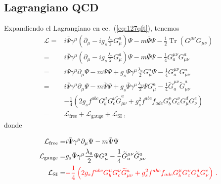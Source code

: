 \subsection{Lagrangiano QCD}

\begin{frame}
Expandiendo el Lagrangiano en ec.~(\ref{eq:127qft}), tenemos
\begin{align}
  \mathcal{L}=&i\bar{\Psi}\gamma^\mu\left(\partial_\mu-i g_s\frac{\lambda_a}{2}G_\mu^a\right)\Psi
  -m\bar{\Psi}\Psi- \frac{1}{2}\operatorname{Tr}\left(G^{\mu\nu} G_{\mu\nu}\right)\nonumber\\
  =&i\bar{\Psi}\gamma^\mu\left(\partial_\mu-i g_s\frac{\lambda_a}{2}G_\mu^a\right)\Psi
  -m\bar{\Psi}\Psi- \frac{1}{4}G^{\mu\nu}_a G_{\mu\nu}^a\nonumber\\
=&i\bar{\Psi}\gamma^\mu\partial_\mu\Psi-m\bar{\Psi}\Psi+g_s\bar{\Psi}\gamma^\mu\frac{\lambda_a}{2}G_\mu^a\Psi
  - \frac{1}{4}G^{\mu\nu}_a G_{\mu\nu}^a\nonumber\\
=&i\bar{\Psi}\gamma^\mu\partial_\mu\Psi-m\bar{\Psi}\Psi+g_s\bar{\Psi}\gamma^\mu\frac{\lambda_a}{2}\Psi G_\mu^a
  - \frac{1}{4}\widetilde{G}^{\mu\nu}_a \widetilde{G}_{\mu\nu}^a\nonumber\\
  &- \frac{1}{4}\left(%
    2g_sf^{a b c}G_b^\mu G_c^\nu\widetilde{G}_{\mu\nu}^a
    +g_s^2f^{a b c}f_{a d e}G_b^\mu G_c^\nu G^d_\mu G^e_\nu\right)\nonumber\\
=&\mathcal{L}_{\text{free}}+\mathcal{L}_{\text{gauge}}+\mathcal{L}_{\text{SI}}\,,
\end{align}
donde

\begin{align}
\label{eq:qcdgauge}
\mathcal{L}_{\text{free}}=&i\bar{\Psi}\gamma^\mu\partial_\mu\Psi-m\bar{\Psi}\Psi\nonumber\\
  \mathcal{L}_{\text{gauge}}=&g_s\bar{\Psi}\gamma^\mu\frac{\lambda_a}{2}\Psi G_\mu^a
  - \frac{1}{4}\widetilde{G}^{\mu\nu}_a \widetilde{G}_{\mu\nu}^a\nonumber\\
  \mathcal{L}_{\text{SI}}=&{\color{red}- \frac{1}{4}\left(%
    2 g_sf^{a b c}G_b^\mu G_c^\nu\widetilde{G}_{\mu\nu}^a
    +g_s^2f^{a b c}f_{a d e}G_b^\mu G_c^\nu G^d_\mu G^e_\nu\right)\,.}
\end{align}


\end{frame}

